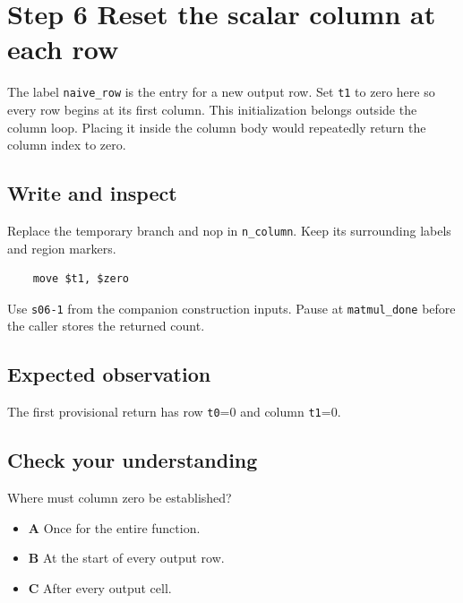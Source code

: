 \section{Step 6 Reset the scalar column at each row}\label{matmul-s06}

The label \texttt{naive\_row} is the entry for a new output row. Set \texttt{t1} to zero here so every row begins at its first column. This initialization belongs outside the column loop. Placing it inside the column body would repeatedly return the column index to zero.

\subsection{Write and inspect}
Replace the temporary branch and nop in \texttt{n\_column}. Keep its surrounding labels and region markers.

\begin{verbatim}
    move $t1, $zero
\end{verbatim}
Use \texttt{s06-1} from the companion construction inputs. Pause at \texttt{matmul\_done} before the caller stores the returned count.

\subsection{Expected observation}
The first provisional return has row \texttt{t0}=0 and column \texttt{t1}=0.

\subsection{Check your understanding}
Where must column zero be established?

\begin{itemize}
  \item \textbf{A} Once for the entire function.
  \item \textbf{B} At the start of every output row.
  \item \textbf{C} After every output cell.
\end{itemize}
